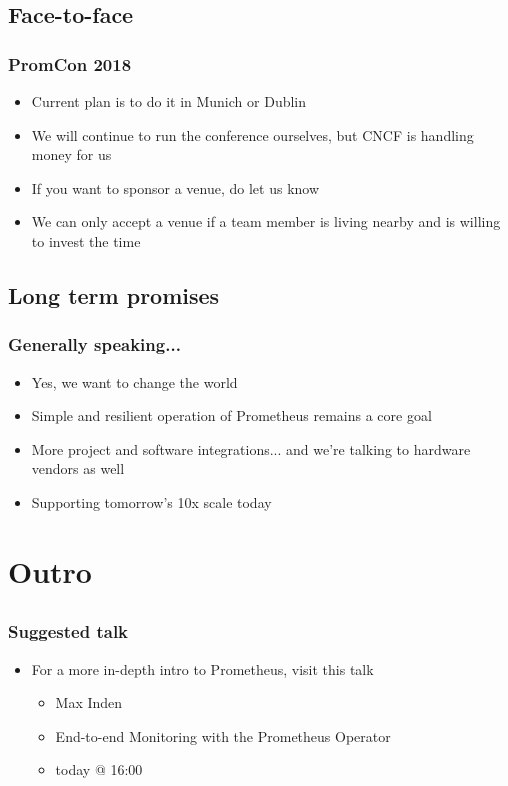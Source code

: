 \documentclass[t]{beamer}
\begin{document}
\subsection{Face-to-face}

\begin{frame}
	\frametitle{PromCon 2018}
	\begin{itemize}
		\item Current plan is to do it in Munich or Dublin
		\item We will continue to run the conference ourselves, but CNCF is handling money for us
		\item If you want to sponsor a venue, do let us know
		\item We can only accept a venue if a team member is living nearby and is willing to invest the time
	\end{itemize}
\end{frame}


\subsection{Long term promises}

\begin{frame}
	\frametitle{Generally speaking...}
	\begin{itemize}
		\item Yes, we want to change the world
		\item Simple and resilient operation of Prometheus remains a core goal
		\item More project and software integrations... and we're talking to hardware vendors as well
		\item Supporting tomorrow's 10x scale today
	\end{itemize}
\end{frame}



\section{Outro}


\subsection{}


\begin{frame}
	\frametitle{Suggested talk}
	\begin{itemize}
		\item For a more in-depth intro to Prometheus, visit this talk
		\begin{itemize}
			\item Max Inden
			\item End-to-end Monitoring with the Prometheus Operator
			\item today @ 16:00
		\end{itemize}
	\end{itemize}
\end{frame}
\end{document}
